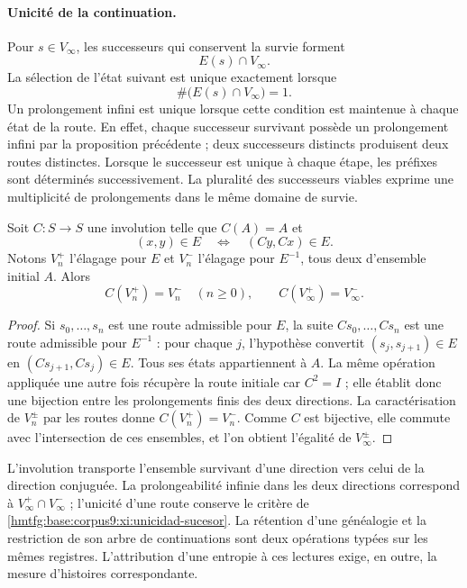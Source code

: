 \paragraph{Unicité de la continuation.}
Pour \(s\in V_\infty\), les successeurs qui conservent la survie forment
\[
 E(s)\cap V_\infty.
\]
La sélection de l’état suivant est unique exactement lorsque
\begin{equation}
 \#\bigl(E(s)\cap V_\infty\bigr)=1.
 \label{hmtfg:base:corpus9:xi:unicidad-sucesor}
\end{equation}
Un prolongement infini est unique lorsque cette condition est maintenue
à chaque état de la route. En effet, chaque successeur survivant possède
un prolongement infini par la proposition précédente ; deux successeurs
distincts produisent deux routes distinctes. Lorsque le successeur est unique à
chaque étape, les préfixes sont déterminés successivement.
La pluralité des successeurs viables exprime une multiplicité de
prolongements dans le même domaine de survie.

\begin{proposition}
\label{hmtfg:base:corpus9:xi:conjugacion-supervivencia}
Soit \(C:S\to S\) une involution telle que \(C(A)=A\) et
\begin{equation}
 (x,y)\in E\quad\Longleftrightarrow\quad(Cy,Cx)\in E.
 \label{hmtfg:base:corpus9:xi:involucion-prolongaciones}
\end{equation}
Notons \(V_n^+\) l’élagage pour \(E\) et \(V_n^-\) l’élagage
pour \(E^{-1}\), tous deux d’ensemble initial \(A\). Alors
\[
 C(V_n^+)=V_n^-\quad(n\geq0),\qquad
 C(V_\infty^+)=V_\infty^-.
\]
\end{proposition}

\begin{proof}
Si \(s_0,\ldots,s_n\) est une route admissible pour \(E\), la suite
\(Cs_0,\ldots,Cs_n\) est une route admissible pour \(E^{-1}\) :
pour chaque \(j\), l’hypothèse convertit
\((s_j,s_{j+1})\in E\) en \((Cs_{j+1},Cs_j)\in E\).
Tous ses états appartiennent à \(A\). La même opération appliquée une autre
fois récupère la route initiale car \(C^2=I\) ; elle établit donc une
bijection entre les prolongements finis des deux directions.
La caractérisation de \(V_n^\pm\) par les routes donne
\(C(V_n^+)=V_n^-\). Comme \(C\) est bijective, elle commute avec
l’intersection de ces ensembles, et l’on obtient l’égalité de
\(V_\infty^\pm\).
\end{proof}

L’involution transporte l’ensemble survivant d’une direction vers celui
de la direction conjuguée. La prolongeabilité infinie dans les deux
directions correspond à \(V_\infty^+\cap V_\infty^-\) ; l’unicité
d’une route conserve le critère de
\eqref{hmtfg:base:corpus9:xi:unicidad-sucesor}. La rétention d’une généalogie
et la restriction de son arbre de continuations sont deux opérations
typées sur les mêmes registres. L’attribution d’une entropie à
ces lectures exige, en outre, la mesure d’histoires correspondante.

